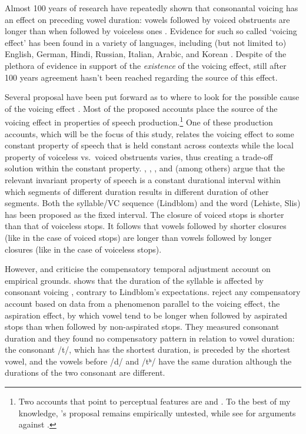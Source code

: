 \documentclass[]{JASAnew}
\begin{document}
Almost 100 years of research have repeatedly shown that consonantal
voicing has an effect on preceding vowel duration: vowels followed by
voiced obstruents are longer than when followed by voiceless ones
\citep{heffner1937, house1953, belasco1953, peterson1960, halle1967, chen1970, klatt1973, lisker1974, raphael1975, javkin1976, maddieson1976, farnetani1986, kluender1988, laeufer1992, fowler1992, hussein1994, esposito2002, lampp2004, warren2005, durvasula2012}.
Evidence for such so called `voicing effect' has been found in a variety
of languages, including (but not limited to) English, German, Hindi,
Russian, Italian, Arabic, and Korean \citep[see][ for a more
comprehensive, but still not exhaustive list]{maddieson1976}. Despite of
the plethora of evidence in support of the \emph{existence} of the
voicing effect, still after 100 years agreement hasn't been reached
regarding the source of this effect.

Several proposal have been put forward as to where to look for the
possible cause of the voicing effect \citep[see][ and
\citet{soskuthy2013} for an overview]{maddieson1976}. Most of the
proposed accounts place the source of the voicing effect in properties
of speech
production.\footnote{Two accounts that point to perceptual features are \citet{javkin1976} and \citet{kluender1988}. To the best of my knowledge, \citet{javkin1976}'s proposal remains empirically untested, while see \citet{fowler1992} for arguments against \citet{kluender1988}.}
One of these production accounts, which will be the focus of this study,
relates the voicing effect to some constant property of speech that is
held constant across contexts while the local property of voiceless
vs.~voiced obstruents varies, thus creating a trade-off solution within
the constant property. \citet{lindblom1967}, \citet{slis1969a},
\citet{slis1969}, and \citet{lehiste1970} (among others) argue that the
relevant invariant property of speech is a constant durational interval
within which segments of different duration results in different
duration of other segments. Both the syllable/VC sequence (Lindblom) and
the word (Lehiste, Slis) has been proposed as the fixed interval. The
closure of voiced stops is shorter than that of voiceless stops. It
follows that vowels followed by shorter closures (like in the case of
voiced stops) are longer than vowels followed by longer closures (like
in the case of voiceless stops).

However, \citet{chen1970} and \citet{maddieson1976} criticise the
compensatory temporal adjustment account on empirical grounds.
\citet{chen1970} shows that the duration of the syllable is affected by
consonant voicing \citep[compatible with findings in][]{jacewicz2009},
contrary to Lindblom's expectations. \citet{maddieson1976} reject any
compensatory account based on data from a phenomenon parallel to the
voicing effect, the aspiration effect, by which vowel tend to be longer
when followed by aspirated stops than when followed by non-aspirated
stops. They measured consonant duration and they found no compensatory
pattern in relation to vowel duration: the consonant /t/, which has the
shortest duration, is preceded by the shortest vowel, and the vowels
before /d/ and /tʰ/ have the same duration although the durations of the
two consonant are different.
\end{document}
